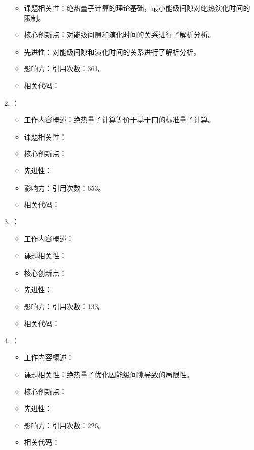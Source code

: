 \begin{enumerate}
\begin{itemize}
                \item 课题相关性：绝热量子计算的理论基础，最小能级间隙对绝热演化时间的限制。
                \item 核心创新点：对能级间隙和演化时间的关系进行了解析分析。
                \item 先进性：对能级间隙和演化时间的关系进行了解析分析。
                \item 影响力：引用次数：361。
                \item 相关代码：
            \end{itemize}
            \item \citet{aharonov2008adiabatic}：
            \begin{itemize}
                \item 工作内容概述：绝热量子计算等价于基于门的标准量子计算。
                \item 课题相关性：
                \item 核心创新点：
                \item 先进性：
                \item 影响力：引用次数：653。
                \item 相关代码：
            \end{itemize}
            \item \citet{bravyi2010complexity}：
            \begin{itemize}
                \item 工作内容概述：
                \item 课题相关性：
                \item 核心创新点：
                \item 先进性：
                \item 影响力：引用次数：133。
                \item 相关代码：
            \end{itemize}
            \item \citet{altshuler2010anderson}：
            \begin{itemize}
                \item 工作内容概述：
                \item 课题相关性：绝热量子优化因能级间隙导致的局限性。
                \item 核心创新点：
                \item 先进性：
                \item 影响力：引用次数：226。
                \item 相关代码：

\end{itemize}
\end{enumerate}
